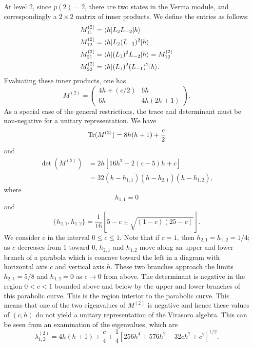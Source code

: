 At level 2, since $p(2) = 2$, there are two states in the Verma module, and correspondingly a $2\times2$ matrix of
inner products. We define the entries as follows:
\begin{align}
  M_{11}^{(2)} &= \langle h\rvert L_2L_{-2}\lvert h\rangle \\
  M_{12}^{(2)} &= \langle h\rvert L_2(L_{-1})^2\lvert h\rangle \\
  M_{21}^{(2)} &= \langle h\rvert(L_1)^2L_{-2}\lvert h\rangle = M_{12}^{(2)} \\
  M_{22}^{(2)} &= \langle h\rvert(L_1)^2(L_{-1})^2\lvert h\rangle .
\end{align}
Evaluating these inner products, one has
\begin{equation}
  M^{(2)} = \begin{pmatrix} 4h+(c/2) & 6h\\ 6h & 4h(2h+1)\end{pmatrix} .
\end{equation}
As a special case of the general restrictions, the trace and determinant must be non-negative for a unitary
representation. We have
\begin{equation}
  \operatorname{Tr}(M^{(2)}) = 8h(h+1) + \frac{c}{2}
\end{equation}
and
\begin{align}
  \det(M^{(2)}) &= 2h[16h^2+2(c-5)h+c] \nonumber\\
  &= 32(h-h_{1,1})(h-h_{2,1})(h-h_{1,2}) ,
\end{align}
where
\begin{equation}
  h_{1,1} = 0
\end{equation}
and
\begin{equation}
  \{h_{2,1},h_{1,2}\} = \frac{1}{16}\left[5-c\pm\sqrt{(1-c)(25-c)}\right] .
\end{equation}
We consider $c$ in the interval $0\le c\le1$. Note that if $c = 1$, then $h_{2,1} = h_{1,2} = 1/4$; as $c$ decreases
from 1 toward 0, $h_{2,1}$ and $h_{1,2}$ move along an upper and lower branch of a parabola which is concave toward the
left in a diagram with horizontal axis $c$ and vertical axis $h$. These two branches approach the limits
$h_{2,1} = 5/8$ and $h_{1,2} = 0$ as $c\to0$ from above. The determinant is negative in the region $0<c<1$ bounded
above and below by the upper and lower branches of this parabolic curve. This is the region interior to the parabolic
curve. This means that one of the two eigenvalues of $M^{(2)}$ is negative and hence these values of $(c,h)$ do not
yield a unitary representation of the Virasoro algebra. This can be seen from an examination of the eigenvalues, which
are
\begin{equation}
  \lambda_{1,2}^{(2)} = 4h(h+1) + \frac{c}{4} \pm \frac{1}{4}\left[256h^4+576h^2-32ch^2+c^2\right]^{1/2} .
\end{equation}

